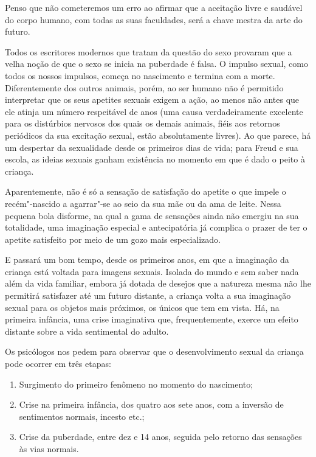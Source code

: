 Penso que não cometeremos um erro ao afirmar que a aceitação livre e
saudável do corpo humano, com todas as suas faculdades, será a chave
mestra da arte do futuro.


Todos os escritores modernos que tratam da questão do sexo provaram que
a velha noção de que o sexo se inicia na puberdade é falsa. O impulso
sexual, como todos os nossos impulsos, começa no nascimento e termina
com a morte. Diferentemente dos outros animais, porém, ao ser humano não é
permitido interpretar que os seus apetites sexuais exigem a ação, ao
menos não antes que ele atinja um número respeitável de anos (uma causa
verdadeiramente excelente para os distúrbios nervosos dos quais os
demais animais, fiéis aos retornos periódicos da sua excitação sexual,
estão absolutamente livres). Ao que parece, há um despertar da
sexualidade desde os primeiros dias de vida; para Freud e sua escola, as
ideias sexuais ganham existência no momento em que é dado o peito à criança.

Aparentemente, não é só a sensação de satisfação do apetite o que
impele o recém"-nascido a agarrar"-se ao seio da sua mãe ou da ama de
leite. Nessa pequena bola disforme, na qual a gama de sensações ainda
não emergiu na sua totalidade, uma imaginação especial e antecipatória
já complica o prazer de ter o apetite satisfeito por meio de um gozo
mais especializado.

E passará um bom tempo, desde os primeiros anos, em que a imaginação da
criança está voltada para imagens sexuais. Isolada do mundo e sem saber
nada além da vida familiar, embora já dotada de desejos que a
natureza mesma não lhe permitirá satisfazer até um futuro distante, a
criança volta a sua imaginação sexual para os objetos mais próximos, os
únicos que tem em vista. Há, na primeira infância, uma crise
imaginativa que, frequentemente, exerce um efeito distante sobre a vida
sentimental do adulto.

Os psicólogos nos pedem para observar que o desenvolvimento sexual da
criança pode ocorrer em três etapas:

\begin{enumerate}
\item Surgimento do primeiro fenômeno no momento do nascimento;

\item Crise na primeira infância, dos quatro aos sete anos, com a inversão de
sentimentos normais, incesto etc.;

\item Crise da puberdade, entre dez e 14 anos, seguida pelo retorno
das sensações às vias normais.
\end{enumerate}

